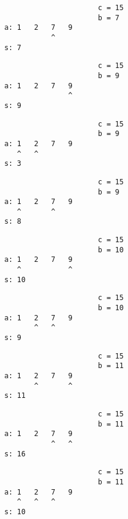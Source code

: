 { \begin{verbatim}
                             c = 15
                             b = 7
       a: 1   2   7   9
                  ^
       s: 7
\end{verbatim} }

{ \begin{verbatim}
                             c = 15
                             b = 9
       a: 1   2   7   9
                      ^
       s: 9
\end{verbatim} }

{ \begin{verbatim}
                             c = 15
                             b = 9
       a: 1   2   7   9
          ^   ^            
       s: 3
\end{verbatim} }

{ \begin{verbatim}
                             c = 15
                             b = 9
       a: 1   2   7   9
          ^       ^        
       s: 8
\end{verbatim} }

{ \begin{verbatim}
                             c = 15
                             b = 10
       a: 1   2   7   9
          ^           ^    
       s: 10
\end{verbatim} }

{ \begin{verbatim}
                             c = 15
                             b = 10
       a: 1   2   7   9
              ^   ^        
       s: 9
\end{verbatim} }

{ \begin{verbatim}
                             c = 15
                             b = 11
       a: 1   2   7   9
              ^       ^    
       s: 11
\end{verbatim} }

{ \begin{verbatim}
                             c = 15
                             b = 11
       a: 1   2   7   9
                  ^   ^    
       s: 16
\end{verbatim} }

{ \begin{verbatim}
                             c = 15
                             b = 11
       a: 1   2   7   9
          ^   ^   ^        
       s: 10
\end{verbatim} }

